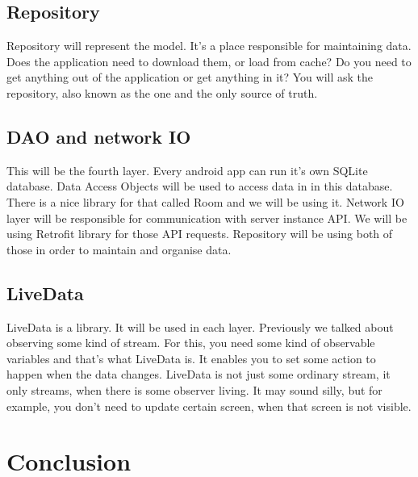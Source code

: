 \subsection{Repository}
Repository will represent the model.
It's a place responsible for maintaining data.
Does the application need to download them, or load from cache?
Do you need to get anything out of the application or get anything in it?
You will ask the repository, also known as the one and the only source of truth.

\subsection{DAO and network IO}
This will be the fourth layer.
Every android app can run it's own SQLite database.
Data Access Objects will be used to access data in in this database.
There is a nice library for that called Room and we will be using it.
Network IO layer will be responsible for communication with server instance API.
We will be using Retrofit library for those API requests.
Repository will be using both of those in order to maintain and organise data.

\subsection{LiveData}
LiveData is a library.
It will be used in each layer. 
Previously we talked about observing some kind of stream.
For this, you need some kind of observable variables and that's what LiveData is.
It enables you to set some action to happen when the data changes.
LiveData is not just some ordinary stream, it only streams, when there is some observer living.
It may sound silly, but for example, you don't need to update certain screen, when that screen is not visible.

\section{Conclusion}

